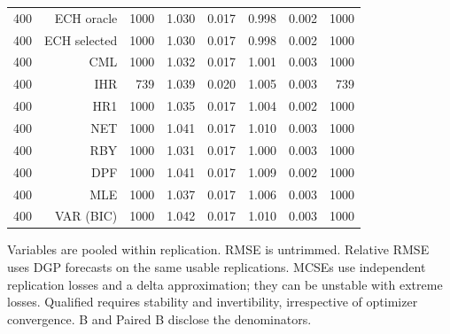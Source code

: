 \begin{table}[p]
\begin{tabular}{rrrrrrrr}
400 & ECH oracle & 1000 & 1.030 & 0.017 & 0.998 & 0.002 & 1000 \\
400 & ECH selected & 1000 & 1.030 & 0.017 & 0.998 & 0.002 & 1000 \\
400 & CML & 1000 & 1.032 & 0.017 & 1.001 & 0.003 & 1000 \\
400 & IHR &  739 & 1.039 & 0.020 & 1.005 & 0.003 &  739 \\
400 & HR1 & 1000 & 1.035 & 0.017 & 1.004 & 0.002 & 1000 \\
400 & NET & 1000 & 1.041 & 0.017 & 1.010 & 0.003 & 1000 \\
400 & RBY & 1000 & 1.031 & 0.017 & 1.000 & 0.003 & 1000 \\
400 & DPF & 1000 & 1.041 & 0.017 & 1.009 & 0.002 & 1000 \\
400 & MLE & 1000 & 1.037 & 0.017 & 1.006 & 0.003 & 1000 \\
400 & VAR (BIC) & 1000 & 1.042 & 0.017 & 1.010 & 0.003 & 1000 \\
\bottomrule\end{tabular}
\par\medskip
\begin{minipage}{0.98\linewidth}\footnotesize Variables are pooled within replication. RMSE is untrimmed. Relative RMSE uses DGP forecasts on the same usable replications. MCSEs use independent replication losses and a delta approximation; they can be unstable with extreme losses. Qualified requires stability and invertibility, irrespective of optimizer convergence. B and Paired B disclose the denominators.\end{minipage}
\end{table}
